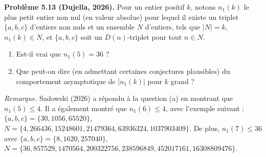 \textbf{Problème 5.13 (Dujella, 2026).} Pour un entier positif $k$, notons $n_1(k)$ le plus petit entier non nul (en valeur absolue) pour lequel il existe un triplet $\{a,b,c\}$ d'entiers non nuls et un ensemble $N$ d'entiers, tels que $|N|=k$, $n_1(k) \in N$, et $\{a,b,c\}$ soit un $D(n)$-triplet pour tout $n \in N$.
\begin{enumerate}
\item[(a)] Est-il vrai que $n_1(5)=36$ ?
\item[(b)] Que peut-on dire (en admettant certaines conjectures plausibles) du comportement asymptotique de $|n_1(k)|$ pour $k$ grand ?
\end{enumerate}

\medskip

\textit{Remarque.} Sadowski (2026) a répondu à la question (a) en montrant que $n_1(5) \leqslant 4$. Il a également montré que $n_1(6) \leqslant 4$, avec l'exemple suivant : $\{a,b,c\}=\{30,1056,65520\}$, $N=\{4,266436,15248601,21479364,63936324,1037903409\}$. De plus, $n_1(7) \leqslant 36$ avec $\{a,b,c\}=\{8,1620,257040\}$, $N=\{36,857529,1470564,200322756,238596849,452017161,16308809476\}$.
